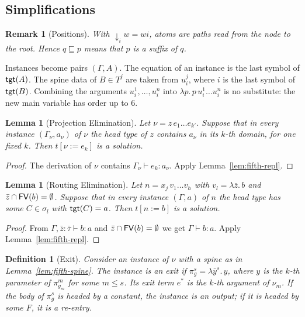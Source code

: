 \documentclass[10pt,a4paper]{article}
\theoremstyle{plain}%
\newtheorem{definition}[theorem]{Definition}
\newtheorem{lemma}[theorem]{Lemma}
\newtheorem{remark}[theorem]{Remark}
\begin{document}
\subsection{Simplifications}
\label{sec:fifth-simpl}

\begin{remark}[Positions]
With ${\downarrow_i}w = wi$, atoms are paths read from the node to the root.
Hence $q \sqsubseteq p$ means that $p$ is a \emph{suffix} of $q$.
\end{remark}

Instances become pairs $(\Gamma, A)$.
The equation of an instance is the last symbol of $\mathsf{tgt}(A)$.
The spine data of $B \in T^j$ are taken from $u_i^j$, where $i$ is the last symbol of $\mathsf{tgt}(B)$.
Combining the arguments $u_i^1, \ldots, u_i^n$ into $\lambda p.\,p\,u_i^1 \ldots u_i^n$ is no substitute: the new main variable has order up to $6$.

\begin{lemma}[Projection Elimination]\label{lem:fifth-proj}
Let $\nu = z\,e_1\ldots e_{k'}$.
Suppose that in every instance $(\Gamma_\nu, a_\nu)$ of $\nu$ the head type of $z$ contains $a_\nu$ in its $k$-th domain, for one fixed $k$.
Then $t[\nu := e_k]$ is a solution.
\end{lemma}

\begin{proof}
The derivation of $\nu$ contains $\Gamma_\nu \vdash e_k : a_\nu$.
Apply Lemma~\ref{lem:fifth-repl}.
\end{proof}

\begin{lemma}[Routing Elimination]\label{lem:fifth-route}
Let $n = x_j\,v_1\ldots v_h$ with $v_l = \lambda \bar z.\,b$ and $\bar z \cap \mathsf{FV}(b) = \emptyset$.
Suppose that in every instance $(\Gamma, a)$ of $n$ the head type has some $C \in \sigma_l$ with $\mathsf{tgt}(C) = a$.
Then $t[n := b]$ is a solution.
\end{lemma}

\begin{proof}
From $\Gamma, \bar z : \bar\tau \vdash b : a$ and $\bar z \cap \mathsf{FV}(b) = \emptyset$ we get $\Gamma \vdash b : a$.
Apply Lemma~\ref{lem:fifth-repl}.
\end{proof}

\begin{definition}[Exit]\label{def:fifth-exit}
Consider an instance of $\nu$ with a spine as in Lemma~\ref{lem:fifth-spine}.
The instance is an \emph{exit} if $\pi^s_g = \lambda \bar y^s.\,y$, where $y$ is the $k$-th parameter of $\pi^m_{g_m}$ for some $m \le s$.
Its \emph{exit term} $e^*$ is the $k$-th argument of $\nu_m$.
If the body of $\pi^s_g$ is headed by a constant, the instance is an \emph{output}; if it is headed by some $F$, it is a \emph{re-entry}.
\end{definition}
\end{document}
